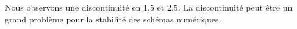 Nous observons une discontinuité en 1,5 et 2,5. La discontinuité peut être un grand problème pour la stabilité des schémas numériques.

